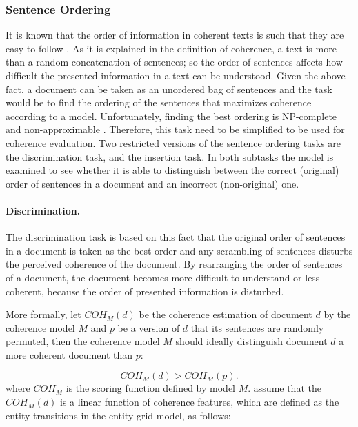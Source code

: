 \subsubsection{Sentence Ordering}
It is known that the order of information in coherent texts is such that they are easy to follow \cite{lapata03,barzilay04,karamanis04b,barzilay05a,soricut06}. 
As it is explained in the definition of coherence, a text is more than a random concatenation of sentences; so the order of sentences affects how difficult the presented information in a text can be understood.  
Given the above fact, a document can be taken as an unordered bag of sentences and the task would be to find the ordering of the sentences that maximizes coherence according to a model. 
Unfortunately, finding the best ordering is NP-complete \cite{?} and non-approximable \cite{althaus04}.
Therefore, this task need to be simplified to be used for coherence evaluation. 
Two restricted versions of the sentence ordering tasks are the discrimination task, and the insertion task. 
In both subtasks the model is examined to see whether it is able to distinguish between the correct (original) order of sentences in a document and an incorrect (non-original) one. 

\paragraph{Discrimination.}
The discrimination task is based on this fact that the original order of sentences in a document is taken as the best order and any scrambling of sentences disturbs the perceived coherence of the document. 
By rearranging the order of sentences of a document, the document becomes more difficult to understand or less coherent, because the order of presented information is disturbed. 

More formally, let $COH_M(d)$ be the coherence estimation of document $d$ by the coherence model $M$ and $p$ be a version of $d$ that its sentences are randomly permuted, then the coherence model $M$ should ideally distinguish document $d$ a more coherent document than $p$:

\begin{equation}
COH_M(d) > COH_M(p). 
\end{equation}
where $COH_M$ is the scoring function defined by model $M$. 
 assume that the $COH_M(d)$ is a linear function of coherence features, which are defined as the entity transitions in the entity grid model, as follows:

